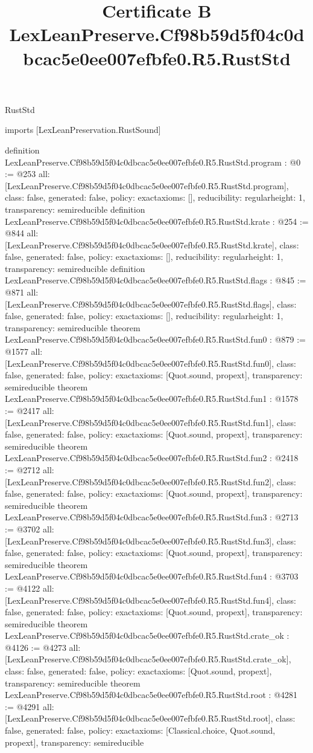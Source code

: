 \begin{lexlean}{RustStd}
\title{Certificate B LexLeanPreserve.Cf98b59d5f04c0dbcac5e0ee007efbfe0.R5.RustStd}
\begin{coremodule}
imports [LexLeanPreservation.RustSound]

definition LexLeanPreserve.Cf98b59d5f04c0dbcac5e0ee007efbfe0.R5.RustStd.program : @0 := @253 {
  all: [LexLeanPreserve.Cf98b59d5f04c0dbcac5e0ee007efbfe0.R5.RustStd.program],
  class: false,
  generated: false,
  policy: exact{axioms: []},
  reducibility: regular{height: 1},
  transparency: semireducible
}
definition LexLeanPreserve.Cf98b59d5f04c0dbcac5e0ee007efbfe0.R5.RustStd.krate : @254 := @844 {
  all: [LexLeanPreserve.Cf98b59d5f04c0dbcac5e0ee007efbfe0.R5.RustStd.krate],
  class: false,
  generated: false,
  policy: exact{axioms: []},
  reducibility: regular{height: 1},
  transparency: semireducible
}
definition LexLeanPreserve.Cf98b59d5f04c0dbcac5e0ee007efbfe0.R5.RustStd.flags : @845 := @871 {
  all: [LexLeanPreserve.Cf98b59d5f04c0dbcac5e0ee007efbfe0.R5.RustStd.flags],
  class: false,
  generated: false,
  policy: exact{axioms: []},
  reducibility: regular{height: 1},
  transparency: semireducible
}
theorem LexLeanPreserve.Cf98b59d5f04c0dbcac5e0ee007efbfe0.R5.RustStd.fun0 : @879 := @1577 {
  all: [LexLeanPreserve.Cf98b59d5f04c0dbcac5e0ee007efbfe0.R5.RustStd.fun0],
  class: false,
  generated: false,
  policy: exact{axioms: [Quot.sound, propext]},
  transparency: semireducible
}
theorem LexLeanPreserve.Cf98b59d5f04c0dbcac5e0ee007efbfe0.R5.RustStd.fun1 : @1578 := @2417 {
  all: [LexLeanPreserve.Cf98b59d5f04c0dbcac5e0ee007efbfe0.R5.RustStd.fun1],
  class: false,
  generated: false,
  policy: exact{axioms: [Quot.sound, propext]},
  transparency: semireducible
}
theorem LexLeanPreserve.Cf98b59d5f04c0dbcac5e0ee007efbfe0.R5.RustStd.fun2 : @2418 := @2712 {
  all: [LexLeanPreserve.Cf98b59d5f04c0dbcac5e0ee007efbfe0.R5.RustStd.fun2],
  class: false,
  generated: false,
  policy: exact{axioms: [Quot.sound, propext]},
  transparency: semireducible
}
theorem LexLeanPreserve.Cf98b59d5f04c0dbcac5e0ee007efbfe0.R5.RustStd.fun3 : @2713 := @3702 {
  all: [LexLeanPreserve.Cf98b59d5f04c0dbcac5e0ee007efbfe0.R5.RustStd.fun3],
  class: false,
  generated: false,
  policy: exact{axioms: [Quot.sound, propext]},
  transparency: semireducible
}
theorem LexLeanPreserve.Cf98b59d5f04c0dbcac5e0ee007efbfe0.R5.RustStd.fun4 : @3703 := @4122 {
  all: [LexLeanPreserve.Cf98b59d5f04c0dbcac5e0ee007efbfe0.R5.RustStd.fun4],
  class: false,
  generated: false,
  policy: exact{axioms: [Quot.sound, propext]},
  transparency: semireducible
}
theorem LexLeanPreserve.Cf98b59d5f04c0dbcac5e0ee007efbfe0.R5.RustStd.crate_ok : @4126 := @4273 {
  all: [LexLeanPreserve.Cf98b59d5f04c0dbcac5e0ee007efbfe0.R5.RustStd.crate_ok],
  class: false,
  generated: false,
  policy: exact{axioms: [Quot.sound, propext]},
  transparency: semireducible
}
theorem LexLeanPreserve.Cf98b59d5f04c0dbcac5e0ee007efbfe0.R5.RustStd.root : @4281 := @4291 {
  all: [LexLeanPreserve.Cf98b59d5f04c0dbcac5e0ee007efbfe0.R5.RustStd.root],
  class: false,
  generated: false,
  policy: exact{axioms: [Classical.choice, Quot.sound, propext]},
  transparency: semireducible
}


\end{coremodule}
\end{lexlean}

